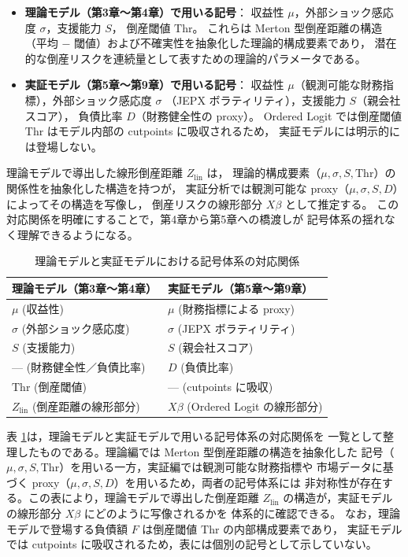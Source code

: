 \begin{itemize}
    \item \textbf{理論モデル（第3章〜第4章）で用いる記号}：
    収益性 $\mu$，外部ショック感応度 $\sigma$，支援能力 $S$，
    倒産閾値 $\mathrm{Thr}$。
    これらは Merton 型倒産距離の構造
    （平均 $-$ 閾値）および不確実性を抽象化した理論的構成要素であり，
    潜在的な倒産リスクを連続量として表すための理論的パラメータである。

    \item \textbf{実証モデル（第5章〜第9章）で用いる記号}：
    収益性 $\mu$（観測可能な財務指標），外部ショック感応度 $\sigma$
    （JEPX ボラティリティ），支援能力 $S$（親会社スコア），
    負債比率 $D$（財務健全性の proxy）。
    Ordered Logit では倒産閾値 $\mathrm{Thr}$ はモデル内部の cutpoints に吸収されるため，
    実証モデルには明示的には登場しない。
\end{itemize}

理論モデルで導出した線形倒産距離 $Z_{\text{lin}}$ は，
理論的構成要素（$\mu,\sigma,S,\mathrm{Thr}$）の関係性を抽象化した構造を持つが，
実証分析では観測可能な proxy（$\mu,\sigma,S,D$）によってその構造を写像し，
倒産リスクの線形部分 $X\beta$ として推定する。
この対応関係を明確にすることで，第4章から第5章への橋渡しが
記号体系の揺れなく理解できるようになる。

\begin{table}[H]
\centering
\caption{理論モデルと実証モデルにおける記号体系の対応関係}
\label{tab:symbol_mapping}
\begin{tabular}{ll}
\hline
\textbf{理論モデル（第3章〜第4章）} & \textbf{実証モデル（第5章〜第9章）} \\
\hline
$\mu$ (収益性) & $\mu$ (財務指標による proxy) \\
$\sigma$ (外部ショック感応度) & $\sigma$ (JEPX ボラティリティ) \\
$S$ (支援能力) & $S$ (親会社スコア) \\
--- (財務健全性／負債比率) & $D$ (負債比率) \\
$\mathrm{Thr}$ (倒産閾値) & --- (cutpoints に吸収) \\
$Z_{\text{lin}}$ (倒産距離の線形部分) & $X\beta$ (Ordered Logit の線形部分) \\
\hline
\end{tabular}
\end{table}

表 \ref{tab:symbol_mapping}は，理論モデルと実証モデルで用いる記号体系の対応関係を
一覧として整理したものである。理論編では Merton 型倒産距離の構造を抽象化した
記号（$\mu,\sigma,S,\mathrm{Thr}$）を用いる一方，実証編では観測可能な財務指標や
市場データに基づく proxy（$\mu,\sigma,S,D$）を用いるため，両者の記号体系には
非対称性が存在する。この表により，理論モデルで導出した倒産距離
$Z_{\text{lin}}$ の構造が，実証モデルの線形部分 $X\beta$ にどのように写像されるかを
体系的に確認できる。
なお，理論モデルで登場する負債額 $F$ は倒産閾値 $\mathrm{Thr}$ の内部構成要素であり，
実証モデルでは cutpoints に吸収されるため，表には個別の記号として示していない。


